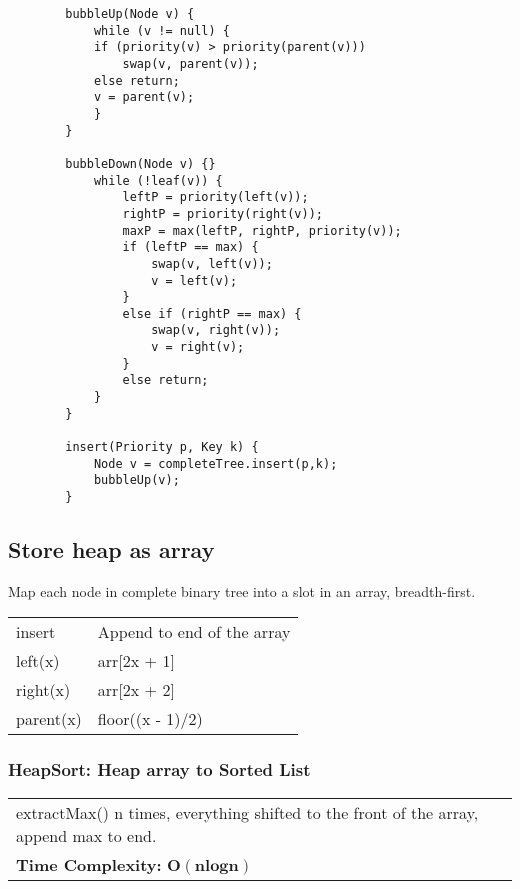 \documentclass{article}
\begin{document}
    \begin{verbatim}
        bubbleUp(Node v) {
            while (v != null) {
            if (priority(v) > priority(parent(v)))
                swap(v, parent(v));
            else return;
            v = parent(v);
            }
        }

        bubbleDown(Node v) {}
            while (!leaf(v)) {
                leftP = priority(left(v));
                rightP = priority(right(v));
                maxP = max(leftP, rightP, priority(v));
                if (leftP == max) {
                    swap(v, left(v));
                    v = left(v); 
                }
                else if (rightP == max) {
                    swap(v, right(v));
                    v = right(v); 
                }
                else return;
            }
        }
            
        insert(Priority p, Key k) {
            Node v = completeTree.insert(p,k);
            bubbleUp(v);
        }
    \end{verbatim}

    \pagebreak
    
    \subsection{Store heap as array}

    Map each node in complete binary tree into a slot in an array, breadth-first.

    \begin{tabular}{ll}
        insert & Append to end of the array\\
        left(x) & arr[2x + 1]\\
        right(x) & arr[2x + 2]\\
        parent(x) & floor((x - 1)/2)\\
    \end{tabular}

    \subsubsection{HeapSort: Heap array to Sorted List}

    \begin{tabular}{l}
        extractMax() n times, everything shifted to the front of the array, append max to end.\\
        \textbf{Time Complexity:} $\bm{O(nlogn)}$\\
    \end{tabular}
\end{document}
